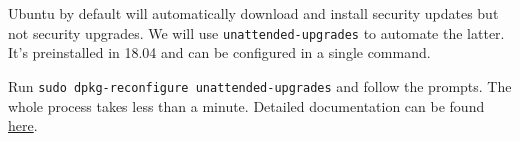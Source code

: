 Ubuntu by default will automatically download and install security updates but not security upgrades. We will use \texttt{unattended-upgrades} to automate the latter. It's preinstalled in 18.04 and can be configured in a single command. 

Run \texttt{sudo dpkg-reconfigure unattended-upgrades} and follow the prompts. The whole process takes less than a minute. Detailed documentation can be found \href{https://help.ubuntu.com/lts/serverguide/automatic-updates.html}{here}.

%
%
%
%
%			

